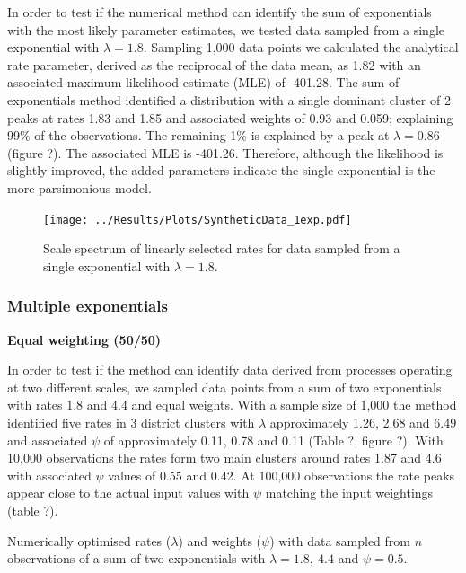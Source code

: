 \documentclass[11pt,usenames,dvipsnames,a4paper]{article}
\begin{document}
\begin{linenumbers}
\hspace{\parindent}
In order to test if the numerical method can identify the sum of exponentials with the most likely parameter estimates, we tested data sampled from a single exponential with $\lambda = 1.8$. Sampling 1,000 data points we calculated the analytical rate parameter, derived as the reciprocal of the data mean, as 1.82 with an associated maximum likelihood estimate (MLE) of -401.28. The sum of exponentials method identified a distribution with a single dominant cluster of 2 peaks at rates 1.83 and 1.85 and associated weights of 0.93 and 0.059; explaining 99\% of the observations. The remaining 1\% is explained by a peak at $\lambda = 0.86$ (figure ?). The associated MLE is -401.26. Therefore, although the likelihood is slightly improved, the added parameters indicate the single exponential is the more parsimonious model.
\end{linenumbers}
\begin{figure}[H]
	\centering
	\texttt{[image: ../Results/Plots/SyntheticData\_1exp.pdf]}
	\caption{Scale spectrum of linearly selected rates for data sampled from a single exponential with $\lambda = 1.8$.}
\end{figure}


\subsubsection{Multiple exponentials}

\noindent
\textbf{Equal weighting (50/50)}
\begin{linenumbers}
	
In order to test if the method can identify data derived from processes operating at two different scales, we sampled data points from a sum of two exponentials with rates 1.8 and 4.4 and equal weights. With a sample size of 1,000 the method identified five rates in 3 district clusters with $\lambda$ approximately 1.26, 2.68 and 6.49 and associated $\psi$ of approximately 0.11, 0.78 and 0.11 (Table ?, figure ?). With 10,000 observations the rates form two main clusters around rates 1.87 and 4.6 with associated $\psi$ values of 0.55 and 0.42. At 100,000 observations the rate peaks appear close to the actual input values with $\psi$ matching the input weightings (table ?).
\end{linenumbers}

\begin{table}[H]
	\centering
	\caption{Numerically optimised rates ($\lambda$) and weights ($\psi$) with data sampled from $n$ observations of a sum of two exponentials with $\lambda = 1.8,\ 4.4$ and $\psi = 0.5$.}
	
\end{table}
\end{document}
